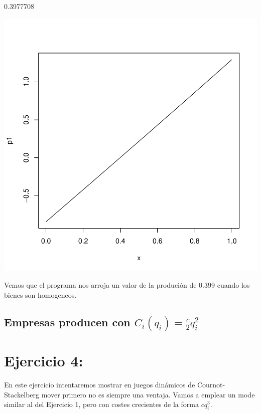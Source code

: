 \documentclass{article}
\begin{document}
\begin{Schunk}
\begin{Soutput}
[1] 0.3977708
\end{Soutput}
\end{Schunk}
\includegraphics{PUTAPRUEBA-002}



Vemos que el programa nos arroja un valor de la produción de 0.399 cuando los bienes son homogeneos.

\subsection{Empresas producen con $C_i(q_i)=\frac{c}{2}q_i^2$}


\section{Ejercicio 4:}

En este ejercicio intentaremos mostrar en juegos dinámicos de Cournot-Stackelberg mover primero no es siempre una ventaja. Vamos a emplear un mode similar al del Ejercicio 1, pero con costes crecientes de la forma $cq_i^3$.
\end{document}

